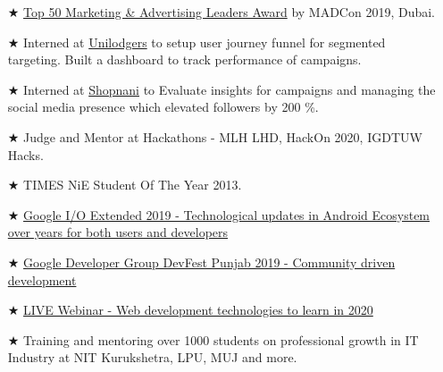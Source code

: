 



\begin{itemize}
    \item [$\bigstar$] {\color{LightGrey} \color{mecol}\href{https://drive.google.com/drive/folders/1W8HZmATotqPVJcRV8dol9LuKinMlSWxu?usp=sharing }{Top 50 Marketing \& Advertising Leaders Award} \color{LightGrey}by MADCon 2019,  Dubai.}
    
     
      
     \item [$\bigstar$] { Interned at {\href{https://www.unilodgers.com/} {Unilodgers}} to setup user journey funnel for segmented targeting. Built a dashboard to track performance of campaigns. }
     
     \item [$\bigstar$] { Interned at {\href{https://angel.co/company/shopnani-1}{Shopnani}} to Evaluate insights for campaigns and managing the social media presence which elevated followers by 200 \%. }
     
      \item [$\bigstar$] { Judge and Mentor at Hackathons - MLH LHD, HackOn 2020,  IGDTUW Hacks.}
      
      \item [$\bigstar$] { TIMES NiE Student Of The Year 2013.}
    
    \end{itemize}
    

\begin{itemize}
      \item [$\bigstar$] \href{https://www.linkedin.com/posts/sarthak-jain24apr98_io19extended-google-io-activity-6542084758430674944-dDkg }   {Google I/O Extended 2019 - Technological updates in Android Ecosystem over years for both users and developers }
    \item [$\bigstar$] \href{https://www.linkedin.com/posts/sarthak-jain24apr98_devfest-googledevelopergroups-womentechmakers-activity-6588625422014091264-Pbc-/} {Google Developer Group DevFest Punjab 2019 - Community driven development}
     
     \item [$\bigstar$] \href{https://www.youtube.com/watch?v=6RS0q9Oih2E&feature=youtu.be&t=368 } {LIVE Webinar - Web development technologies to learn in 2020}
   
    
    \item [$\bigstar$] {Training and mentoring over 1000 students on professional growth in IT Industry at NIT Kurukshetra, LPU, MUJ and more.  }
    
    \end{itemize}

